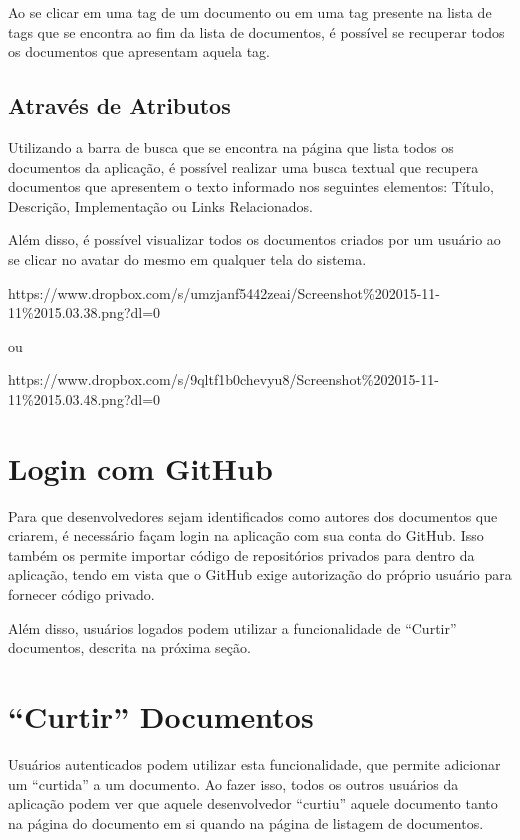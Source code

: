 Ao se clicar em uma tag de um documento ou em uma tag presente na lista de tags que se encontra ao fim da lista de documentos, é possível se recuperar todos os documentos que apresentam aquela tag.

\subsection{Através de Atributos}

Utilizando a barra de busca que se encontra na página que lista todos os documentos da aplicação, é possível realizar uma busca textual que recupera documentos que apresentem o texto informado nos seguintes elementos: Título, Descrição, Implementação ou Links Relacionados.

Além disso, é possível visualizar todos os documentos criados por um usuário ao se clicar no avatar do mesmo em qualquer tela do sistema.

https://www.dropbox.com/s/umzjanf5442zeai/Screenshot\%202015-11-11\%2015.03.38.png?dl=0

ou

https://www.dropbox.com/s/9qltf1b0chevyu8/Screenshot\%202015-11-11\%2015.03.48.png?dl=0

\section{Login com GitHub}

Para que desenvolvedores sejam identificados como autores dos documentos que criarem, é necessário façam login na aplicação com sua conta do GitHub. Isso também os permite importar código de repositórios privados para dentro da aplicação, tendo em vista que o GitHub exige autorização do próprio usuário para fornecer código privado.

Além disso, usuários logados podem utilizar a funcionalidade de ``Curtir'' documentos, descrita na próxima seção.

\section{``Curtir'' Documentos}

Usuários autenticados podem utilizar esta funcionalidade, que permite adicionar um ``curtida'' a um documento. Ao fazer isso, todos os outros usuários da aplicação podem ver que aquele desenvolvedor ``curtiu'' aquele documento tanto na página do documento em si quando na página de listagem de documentos.

